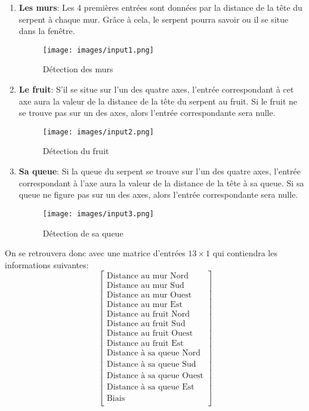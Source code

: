 \documentclass[12pt, a4paper, openany]{book}
\begin{document}
\begin{enumerate}
\item \textbf{Les murs}: Les 4 premières entrées sont données par la distance de la tête du serpent à chaque mur. Grâce à cela, le serpent pourra savoir ou il se situe dans la fenêtre.
\begin{figure}[H]
    \centering
    \texttt{[image: images/input1.png]}
    \caption{Détection des murs}
\end{figure}
\item \textbf{Le fruit}: S'il se situe sur l'un des quatre axes, l'entrée correspondant à cet axe aura la valeur de la distance de la tête du serpent au fruit. Si le fruit ne se trouve pas sur un des axes, alors l'entrée correspondante sera nulle.
\begin{figure}[H]
    \centering
    \texttt{[image: images/input2.png]}
    \caption{Détection du fruit}
\end{figure}\newpage
\item \textbf{Sa queue}: Si la queue du serpent se trouve sur l'un des quatre axes, l'entrée correspondant à l'axe aura la valeur de la distance de la tête à sa queue. Si sa queue ne figure pas sur un des axes, alors l'entrée correspondante sera nulle.
\begin{figure}[H]
    \centering
    \texttt{[image: images/input3.png]}
    \caption{Détection de sa queue}
\end{figure}
\end{enumerate}

On se retrouvera donc avec une matrice d'entrées $13\times1$ qui contiendra les informations suivantes:
$$
\begin{bmatrix}
\textrm{Distance au mur Nord}\\ 
\textrm{Distance au mur Sud}\\ 
\textrm{Distance au mur Ouest}\\ 
\textrm{Distance au mur Est}\\ 
\textrm{Distance au fruit Nord}\\ 
\textrm{Distance au fruit Sud}\\ 
\textrm{Distance au fruit Ouest}\\
\textrm{Distance au fruit Est}\\  
\textrm{Distance à sa queue Nord}\\ 
\textrm{Distance à sa queue Sud}\\ 
\textrm{Distance à sa queue Ouest}\\ 
\textrm{Distance à sa queue Est}\\ 
\textrm{Biais}\\ 
\end{bmatrix}
$$
\end{document}
